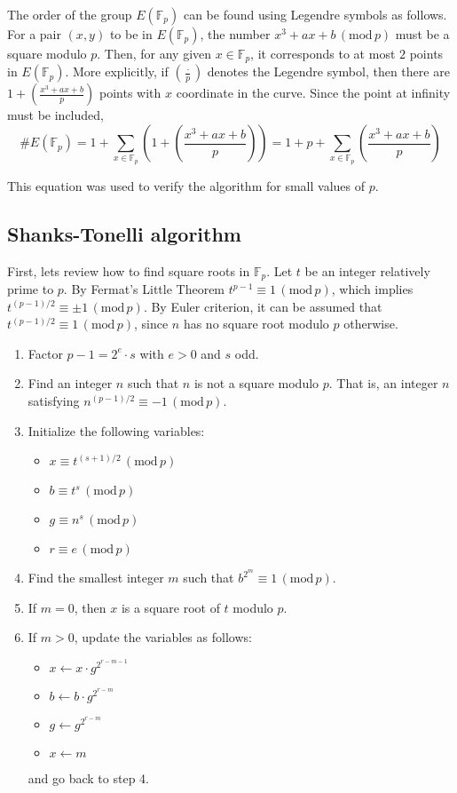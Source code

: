 \documentclass[letter,11pt,reqno]{article}
\theoremstyle{definition}
\theoremstyle{definition}
\theoremstyle{definition}
\theoremstyle{remark}
\theoremstyle{definition}
\theoremstyle{definition}
\newcommand{\Fp}{\mathbb{F}_p}
\newcommand{\modp}{\,(\text{mod}\, p)}
\begin{document}
The order of the group $E(\Fp)$ can be found using Legendre symbols as follows. For a pair $(x,y)$ to be in $E(\Fp)$, the number $x^3+ax+b \modp$ must be a square modulo $p$. Then, for any given $x\in\Fp$, it corresponds to at most $2$ points in $E(\Fp)$. More explicitly, if $\left( \frac{\cdot}{p} \right)$ denotes the Legendre symbol, then there are $1+\left( \frac{x^3+ax+b}{p}\right)$ points with $x$ coordinate in the curve. Since the point at infinity must be included, 
\begin{equation}\label{eq:legendre}
    \# E(\Fp) = 1 + \sum_{x\in\Fp}\left( 1+\left( \frac{x^3+ax+b}{p}\right) \right) = 1 + p + \sum_{x\in\Fp}\left( \frac{x^3+ax+b}{p}\right)
\end{equation}

\noindent This equation was used to verify the algorithm for small values of $p$. 

\subsection{Shanks-Tonelli algorithm}
First, lets review how to find square roots in $\Fp$. Let $t$ be an integer relatively prime to $p$. By Fermat's Little Theorem $t^{p-1} \equiv 1 \,(\text{mod}\, p)$, which implies $t^{(p-1)/2} \equiv \pm 1 \,(\text{mod}\, p)$. By Euler criterion, it can be assumed that $t^{(p-1)/2} \equiv 1 \,(\text{mod}\, p)$, since $n$ has no square root modulo $p$ otherwise. 

\begin{enumerate}
    \item Factor $p-1 = 2^{e}\cdot s$ with $e>0$ and $s$ odd. 
    \item Find an integer $n$ such that $n$ is not a square modulo $p$. That is, an integer $n$ satisfying $n^{(p-1)/2} \equiv -1 \,(\text{mod}\, p)$.
    \item Initialize the following variables:
    \begin{itemize}
        \item $x\equiv t^{(s+1)/2} \modp$
        \item $b \equiv t^s \modp$
        \item $g \equiv n^s \modp$
        \item $r\equiv e \modp$
    \end{itemize}
    \item Find the smallest integer $m$ such that $b^{2^m}\equiv 1 \modp$.
    \item If $m=0$, then $x$ is a square root of $t$ modulo $p$.
    \item If $m>0$, update the variables as follows:
    \begin{itemize}
        \item $x \longleftarrow x\cdot g^{2^{r-m-1}}$
        \item $b \longleftarrow b\cdot g^{2^{r-m}}$
        \item $g \longleftarrow g^{2^{r-m}}$
        \item $x \longleftarrow m$      
    \end{itemize}
    and go back to step 4.
\end{enumerate}
\end{document}
